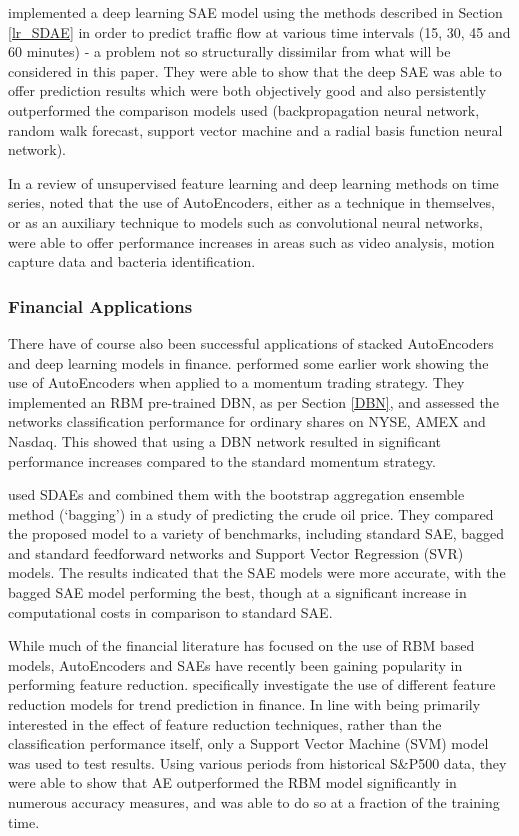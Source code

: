 \documentclass[a4paper,11pt,oneside]{article}
\theoremstyle{plain}
\theoremstyle{definition}
\begin{document}
	\citet{Lv} implemented a deep learning SAE model using the methods described in Section \ref{lr_SDAE} in order to 
	predict traffic flow at various time intervals (15, 30, 45 and 60 minutes) - a problem not so structurally dissimilar 
	from what will be considered in this paper. They were able to show that the deep SAE was able to offer prediction 
	results which were both objectively good and also persistently outperformed the comparison models used 
	(backpropagation neural network, random walk forecast, support vector machine and a radial basis function 
	neural network).
	\hfill \break 
	
	In a review of unsupervised feature learning and deep learning methods on time series, \citet{Langkvist} noted that 
	the use of AutoEncoders, either as a technique in themselves, or as an auxiliary technique to models 
	such as convolutional neural networks, were able to offer performance increases in areas such as video analysis, 
	motion capture data and bacteria identification.
	
	\subsubsection{Financial Applications}
	
	There have of course also been successful applications of stacked AutoEncoders and deep learning models in 
	finance. \citet{Takeuchi} performed some earlier work showing the use of AutoEncoders when applied to a 
	momentum trading strategy. They implemented an RBM pre-trained DBN, as per Section \ref{DBN}, and assessed the 
	networks classification performance for ordinary shares on NYSE, AMEX and Nasdaq. This showed that using a 
	DBN network resulted in significant performance increases compared to the standard momentum strategy.
	\hfill \break 
	
	\citet{Zhao} used SDAEs and combined them with the bootstrap aggregation ensemble method (‘bagging’) in a 
	study of predicting the crude oil price. They compared the proposed model to a variety of benchmarks, including 
	standard SAE, bagged and standard feedforward networks and Support Vector Regression (SVR) models. The results indicated that the SAE models 
	were more accurate, with the bagged SAE model performing the best, though at a significant increase in 
	computational costs in comparison to standard SAE.
	\hfill \break 
	
	While much of the financial literature has focused on the use of RBM based models, AutoEncoders and SAEs have 
	recently been gaining popularity in performing feature reduction. \citet{Troiano} specifically investigate the use of 
	different feature reduction models for trend prediction in finance. In line with being primarily 
	interested in the effect of feature reduction techniques, rather than the classification performance itself, only a Support 
	Vector Machine (SVM) model was used to test results. Using various periods from historical S\&P500 data, they were able to show 
	that AE outperformed the RBM model significantly in numerous accuracy measures, and was able to do so at a 
	fraction of the training time.
	\hfill \break 
	
\end{document}
